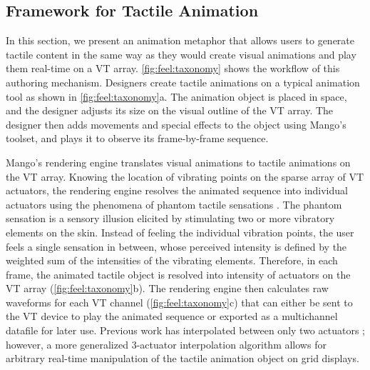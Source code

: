 %
%




\subsection{Framework for Tactile Animation}
%


In this section, we present an animation metaphor that allows users to generate tactile content in the same way as they would create visual animations and play them real-time on a VT array.
\autoref{fig:feel:taxonomy} shows the workflow of this authoring mechanism.  
Designers create tactile animations on a typical animation tool as shown in \autoref{fig:feel:taxonomy}a.
The animation object is placed in space, and the designer adjusts %
its size on the visual outline of the VT array. %
The designer then adds movements and special effects to the object using Mango's toolset,
and plays it to observe its frame-by-frame sequence. %

Mango's rendering engine translates visual animations to tactile animations on the VT array.
Knowing the location of vibrating points on the sparse array of VT actuators, the rendering engine resolves the animated sequence into individual actuators using the phenomena of phantom tactile sensations \cite{Alles1970,Israr2011a}. 
The phantom sensation is a sensory illusion elicited by stimulating two or more vibratory elements on the skin.
Instead of feeling the individual vibration points, the user feels a single sensation in between, whose perceived intensity is defined by the weighted sum of the intensities of the vibrating elements.
Therefore, in each frame, the animated tactile object is resolved into intensity of actuators on the VT array (\autoref{fig:feel:taxonomy}b).
The rendering engine then calculates raw waveforms for each VT channel (\autoref{fig:feel:taxonomy}c) that can either be sent to the VT device to play the animated sequence or exported as a multichannel datafile for later use.
Previous work has interpolated between only two actuators \cite{Seo2013,Lee2012a}; %
however, a more generalized 3-actuator interpolation algorithm allows for arbitrary real-time manipulation of the tactile animation object on grid displays. 

